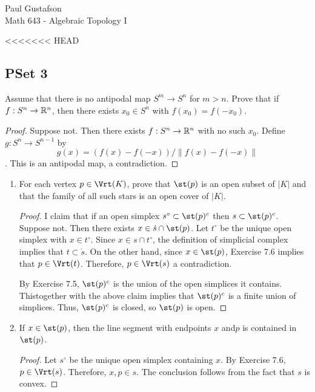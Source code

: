 \documentclass{article}
\begin{document}
\noindent Paul Gustafson\\
\noindent Math 643 - Algebraic Topology I

<<<<<<< HEAD

\subsection*{PSet 3}
 Assume that there is no antipodal map $S^m \to S^n$ for $m > n$. Prove
 that if $f: S^n \to \mathbb{R}^n$, then there exists $x_0 \in S^n$ with $f(x_0) = f(-x_0)$.
\begin{proof}
Suppose not. Then there exists $f:S^n \to \mathbb{R}^n$ with no such $x_0$. Define $g: S^n \to S^{n-1}$ by
$$g(x) = (f(x) - f(-x))/\|f(x) - f(-x)\|$$.
This is an antipodal map, a contradiction.
\end{proof}

\begin{enumerate}
\item For each vertex $p \in \Vrt(K)$, prove that $\st(p)$ is an open subset of $|K|$ and that the family of all such stars is an open cover of $|K|$.
\begin{proof}
I claim that if an open simplex $s^\circ \subset \st(p)^c$ then $s \subset \st(p)^c$. Suppose not.  Then there exists $x \in \dot s \cap \st(p)$. Let $t^\circ$ be the unique open simplex with $x \in t^\circ$. Since $x \in s \cap t^\circ$, the definition of simplicial complex implies that $t \subset \dot s$. On the other hand, since $x \in \st(p)$, Exercise 7.6 implies that $p \in \Vrt(t)$. Therefore, $p \in \Vrt(s)$ a contradiction.

By Exercise 7.5, $\st(p)^c$ is the union of the open simplices it contains. Thistogether with the above claim implies that $\st(p)^c$ is a finite union of simplices. Thus, $\st(p)^c$ is closed, so $\st(p)$ is open.
\end{proof}

\item If $x \in \st(p)$, then the line segment with endpoints $x$ and$p$ is contained in $\st(p)$.
\begin{proof}
Let $s^\circ$ be the unique open simplex containing $x$.  By Exercise 7.6, $p \in \Vrt(s)$. Therefore, $x,p \in s$. The conclusion follows from the fact that $s$ is convex.
\end{proof}
\end{enumerate}
\end{document}
